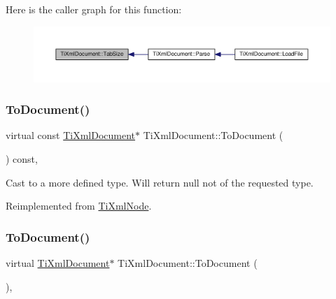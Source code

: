 Here is the caller graph for this function\+:
\nopagebreak
\begin{figure}[H]
\begin{center}
\leavevmode
\includegraphics[width=350pt]{class_ti_xml_document_a81e6ffeee8f5d025a171eabf79abdad7_icgraph}
\end{center}
\end{figure}
\mbox{\label{class_ti_xml_document_a468e582640e3c4f740f7168d8b4a6e4a}} 
\subsubsection{\texorpdfstring{To\+Document()}{ToDocument()}\hspace{0.1cm}{\footnotesize\ttfamily [1/2]}}
{\footnotesize\ttfamily virtual const \hyperlink{class_ti_xml_document}{Ti\+Xml\+Document}$\ast$ Ti\+Xml\+Document\+::\+To\+Document (\begin{DoxyParamCaption}{ }\end{DoxyParamCaption}) const\hspace{0.3cm}{\ttfamily [inline]}, {\ttfamily [virtual]}}



Cast to a more defined type. Will return null not of the requested type. 



Reimplemented from \hyperlink{class_ti_xml_node_a775a904618cad6e4a8049bda4f5a6aa9}{Ti\+Xml\+Node}.

\mbox{\label{class_ti_xml_document_a1025d942a1f328fd742d545e37efdd42}} 
\subsubsection{\texorpdfstring{To\+Document()}{ToDocument()}\hspace{0.1cm}{\footnotesize\ttfamily [2/2]}}
{\footnotesize\ttfamily virtual \hyperlink{class_ti_xml_document}{Ti\+Xml\+Document}$\ast$ Ti\+Xml\+Document\+::\+To\+Document (\begin{DoxyParamCaption}{ }\end{DoxyParamCaption})\hspace{0.3cm}{\ttfamily [inline]}, {\ttfamily [virtual]}}



